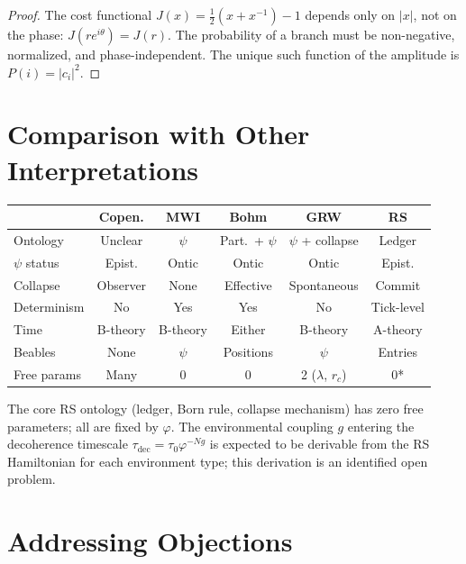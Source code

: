 \documentclass[12pt,a4paper]{article}
\theoremstyle{definition}
\theoremstyle{remark}
\begin{document}
\begin{proof}
The cost functional $J(x) = \tfrac{1}{2}(x + x^{-1}) - 1$ depends
only on $|x|$, not on the phase: $J(re^{i\theta}) = J(r)$.  The
probability of a branch must be non-negative, normalized, and
phase-independent.  The unique such function of the amplitude is
$P(i) = |c_i|^2$.
\end{proof}

\section{Comparison with Other Interpretations}
\label{sec:comparison}

\begin{center}
\renewcommand{\arraystretch}{1.3}
\begin{tabular}{@{}lccccc@{}}
\toprule
& \textbf{Copen.} & \textbf{MWI} & \textbf{Bohm} &
\textbf{GRW} & \textbf{RS} \\
\midrule
Ontology & Unclear & $\psi$ & Part.\ + $\psi$ & $\psi$ +
collapse & Ledger \\
$\psi$ status & Epist. & Ontic & Ontic & Ontic & Epist. \\
Collapse & Observer & None & Effective & Spontaneous &
Commit \\
Determinism & No & Yes & Yes & No & Tick-level \\
Time & B-theory & B-theory & Either & B-theory & A-theory \\
Beables & None & $\psi$ & Positions & $\psi$ & Entries \\
Free params & Many & 0 & 0 & 2 ($\lambda$, $r_c$) & 0* \\
\bottomrule
\end{tabular}
\end{center}

\noindent *The core RS ontology (ledger, Born rule, collapse mechanism)
has zero free parameters; all are fixed by $\varphi$.  The
environmental coupling $g$ entering the decoherence timescale
$\tau_{\mathrm{dec}} = \tau_0 \varphi^{-Ng}$ is expected to be
derivable from the RS Hamiltonian for each environment type; this
derivation is an identified open problem.

\section{Addressing Objections}
\label{sec:objections}
\end{document}
